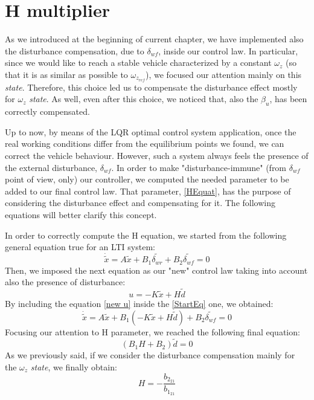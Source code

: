 \section{H multiplier} \label{H section}
As we introduced at the beginning of current chapter, we have implemented also the disturbance compensation, due to $\delta_{wf}$, inside our control law. In particular, since we would like to reach a stable vehicle characterized by a constant $\omega_{z}$ (so that it is as similar as possible to $\omega_{z_{ref}}$), we focused our attention mainly on this \textit{state}. Therefore, this choice led us to compensate the disturbance effect mostly for $\omega_{z}$ \textit{state}. As well, even after this choice, we noticed that, also the $\beta_{u}$, has been correctly compensated.

Up to now, by means of the LQR optimal control system application, once the real working conditions differ from the equilibrium points we found, we can correct the vehicle behaviour. However, such a system always feels the presence of the external disturbance, $\delta_{wf}$. In order to make "disturbance-immune" (from $\delta_{wf}$ point of view, only) our controller, we computed the needed parameter to be added to our final control law. That parameter, \ref{HEquat}, has the purpose of considering the disturbance effect and compensating for it.
The following equations will better clarify this concept.

In order to correctly compute the H equation, we started from the following general equation true for an LTI system:
\begin{equation} \label{StartEq}
	\dot{\tilde{x}} = A \tilde{x} + B_{1}\tilde{\delta_{wr}} + B_{2}\tilde{\delta_{wf}} = 0
\end{equation}
Then, we imposed the next equation as our "new" control law taking into account also the presence of disturbance:
\begin{equation} \label{new u}
	u = - K \tilde{x} + H \tilde{d}
\end{equation}
By including the equation \ref{new u} inside the \ref{StartEq} one, we obtained:
\begin{equation}
	\dot{\tilde{x}} = A \tilde{x} + B_{1}(- K \tilde{x} + H \tilde{d}) + B_{2}\tilde{\delta_{wf}} = 0
\end{equation}
Focusing our attention to H parameter, we reached the following final equation:
\begin{equation}
 (B_{1} H + B_{2})\tilde{d} = 0
\end{equation}
As we previously said, if we consider the disturbance compensation mainly for the $\omega_{z}$ \textit{state}, we finally obtain:
\begin{equation}
\label{HEquat}
H = -\frac{b_{{2}_{21}}}{b_{{1}_{21}}}
\end{equation}
